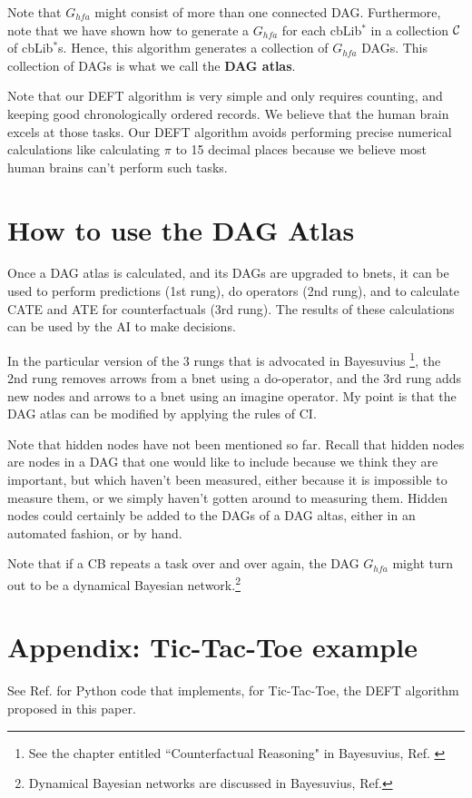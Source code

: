 \documentclass[12pt]{article}
\begin{document}
Note that $G_{hfa}$
might consist of more than
one connected DAG.
Furthermore, note 
that we
have shown
how to generate 
a $G_{hfa}$ for each cbLib$^*$ 
in
a collection ${\cal C}$
of cbLib$^*$s.
Hence, this algorithm
generates a collection 
of $G_{hfa}$ DAGs.
This collection
of DAGs is what we call
the {\bf DAG atlas}.

Note that our DEFT algorithm is very simple and only requires counting, 
and keeping good chronologically
ordered records. We believe that
the human brain excels at those tasks. Our DEFT algorithm avoids performing precise numerical calculations like calculating $\pi$ to 15 decimal places because we believe most human brains can't perform such tasks.
 


\section{How to use the DAG Atlas}
Once a DAG atlas is calculated,
and its DAGs are upgraded to bnets, 
it can be used to 
perform predictions (1st rung),
do operators (2nd rung),
and to calculate CATE and 
ATE for counterfactuals (3rd rung).
The results of these calculations
can be used by the AI to make decisions.


In the particular version 
of the 3 rungs that is advocated
in Bayesuvius \footnote{See the chapter
entitled ``Counterfactual Reasoning" in
Bayesuvius, Ref.
\cite{bayesuvius}},
the 2nd rung removes arrows from a bnet
using a do-operator,
and the 3rd rung adds new nodes 
and arrows to a bnet
using an imagine operator.
My point is that the DAG atlas
can be modified by applying
the rules of CI.

Note that 
hidden nodes
have not been mentioned
so far. Recall
that hidden nodes are
nodes in a DAG
that one would like
to include 
because we think
they are important, but
which haven't been
measured, 
either because
it is impossible to 
measure them, 
or we simply haven't gotten
around to measuring them.
Hidden nodes could certainly
be added to the DAGs of a DAG 
altas,
either in an automated fashion,
or by hand.

Note that if a CB repeats 
a task over and over again,
the DAG $G_{hfa}$
might turn out
to be a dynamical Bayesian network.\footnote{
Dynamical Bayesian networks are discussed in
Bayesuvius, Ref.\cite{bayesuvius}}

\appendix
\section{Appendix: Tic-Tac-Toe example}
See Ref.\cite{tic-tac-toe} for Python code
that implements,
for Tic-Tac-Toe, the DEFT algorithm 
proposed in this paper.
\end{document}

